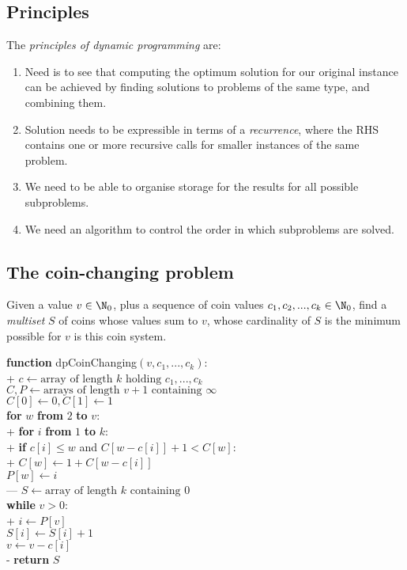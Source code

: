 \documentclass{article}
\begin{document}
\subsection{Principles}
\begin{definition}[L16]
	The \emph{principles of dynamic programming} are:
	\begin{enumerate}[label=(dp\arabic*)]
		\item Need is to see that computing the optimum solution for our original 
			instance can be achieved by finding solutions to problems of the same 
			type, and combining them.
		\item Solution needs to be expressible in terms of a \emph{recurrence}, 
			where the RHS contains one or more recursive calls for smaller 
			instances of the same problem.
		\item We need to be able to organise storage for the results for all 
			possible subproblems.
		\item We need an algorithm to control the order in which subproblems 
			are solved.
	\end{enumerate}
\end{definition}

\subsection{The coin-changing problem}

\begin{definition}[L16]
	Given a value $v\in\N_0$, plus a sequence of coin values $c_1,c_2,...,c_k\in\N_0$,
	find a \emph{multiset} $S$ of coins whose values sum to $v$, whose cardinality
	of $S$ is the minimum possible for $v$ is this coin system.
\end{definition}

\begin{pseudo}
\textbf{function} \textsf{dpCoinChanging}$(v, c_1, ..., c_k)$:					\\+
	$c\leftarrow\text{array of length $k$ holding $c_1, ..., c_k$}$				\\
	$C,P\leftarrow\text{arrays of length $v+1$ containing $\infty$}$			\\
	$C[0]\leftarrow 0,C[1]\leftarrow 1$											\\
	\textbf{for} $w$ \textbf{from} $2$ \textbf{to} $v$:							\\+
		\textbf{for} $i$ \textbf{from} $1$ \textbf{to} $k$:						\\+
			\textbf{if} $c[i]\leq w$ and $C[w-c[i]]+1<C[w]$:					\\+
				$C[w]\leftarrow 1 + C[w-c[i]]$									\\
				$P[w]\leftarrow i$												\\---
	$S\leftarrow\text{array of length $k$ containing $0$}$						\\
	\textbf{while} $v>0$:														\\+
		$i\leftarrow P[v]$														\\
		$S[i]\leftarrow S[i]+1$													\\
		$v\leftarrow v - c[i]$													\\-
	\textbf{return} $S$
\end{pseudo}
\end{document}
